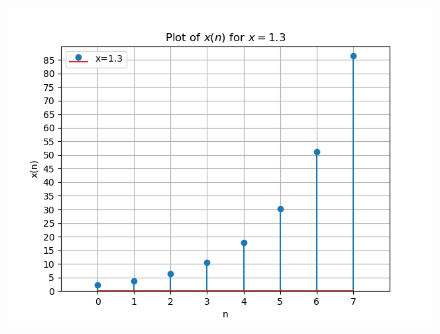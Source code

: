 \documentclass[journal,12pt,twocolumn]{IEEEtran}
\theoremstyle{remark}
\begin{document}
\begin{figure}[ht!]
	\includegraphics[width=\columnwidth]{figs/plot_3.png}
	\caption{}
	\label{fig:1.3}
\end{figure}
\end{document}

